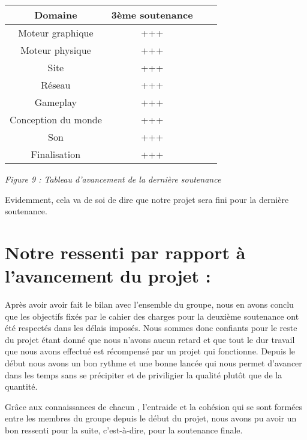 \documentclass{article}
\begin{document}
 \quad
\begin{centering}

			\begin{tabular}{|c|c|c|c|}
\hline Domaine &  3ème soutenance \\
\hline Moteur graphique & +++\\
\hline Moteur physique  & +++\\
\hline Site & +++\\
\hline Réseau & +++\\
\hline Gameplay &  +++\\
\hline Conception du monde & +++\\
\hline Son &  +++\\
\hline Finalisation &  +++ \\
\hline
			\end {tabular}

\quad

\textit{Figure 9 : Tableau d'avancement de la dernière soutenance}


\end{centering}

\quad

\quad

Evidemment, cela va de soi de dire que notre projet sera fini pour la dernière soutenance.
\newpage

\section {Notre ressenti par rapport à l'avancement du projet :}

\quad

\quad

Après avoir avoir fait le bilan avec l’ensemble du groupe, nous en avons conclu que les objectifs fixés par le cahier des charges pour la deuxième soutenance ont été respectés dans les délais imposés. Nous sommes donc confiants pour le reste du projet étant donné que nous n’avons aucun retard et que tout le dur travail que nous avons effectué est récompensé par un projet qui fonctionne.
Depuis le début nous avons un bon rythme et une bonne lancée qui nous permet d’avancer dans les temps sans se précipiter et de priviligier la qualité plutôt que de la quantité.

Grâce aux connaissances de chacun , l’entraide et la cohésion qui se sont formées entre les membres du groupe depuis le début du projet, nous avons pu avoir un bon ressenti pour la suite, c’est-à-dire, pour la soutenance finale.
\end{document}

